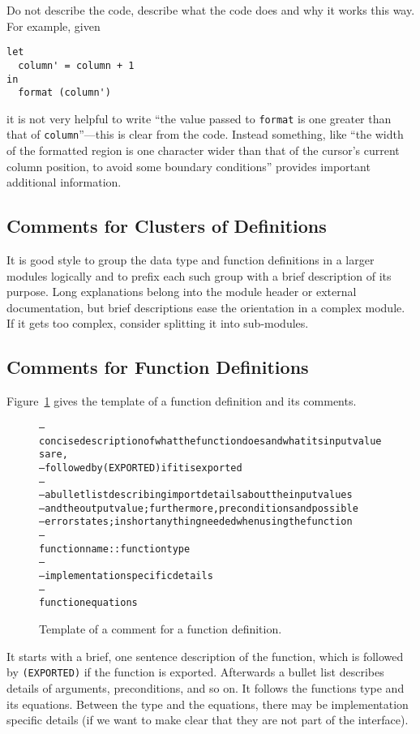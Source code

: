 \documentclass{report}
\newcommand{\code}[1]{\texttt{#1}}
\newcommand{\schema}[1]{\textrm{#1}}
\begin{document}
Do not describe the code, describe what the code does and why it works this
way.  For example, given
%
\begin{verbatim}
let
  column' = column + 1
in
  format (column')
\end{verbatim}
%
it is not very helpful to write ``the value passed to \texttt{format} is one
greater than that of \texttt{column}''---this is clear from the code.  Instead
something, like ``the width of the formatted region is one character wider than
that of the cursor's current column position, to avoid some boundary
conditions'' provides important additional information.

\subsection{Comments for Clusters of Definitions}

It is good style to group the data type and function definitions in a larger
modules logically and to prefix each such group with a brief description of
its purpose.  Long explanations belong into the module header or external
documentation, but brief descriptions ease the orientation in a complex
module.  If it gets too complex, consider splitting it into sub-modules.

\subsection{Comments for Function Definitions}

Figure~\ref{fig:fun-comment} gives the template of a function definition and
its comments.
%
\begin{figure}
\begin{alltt}
-- \schema{concise description of what the function does and what its input values are,}
-- \schema{followed by \texttt{(EXPORTED)} if it is exported}
--
-- \schema{a bullet list describing import details about the input values}
-- \schema{and the output value; furthermore, preconditions and possible}
-- \schema{error states; in short anything needed when using the function}
--
\schema{function name} :: \schema{function type}
--
-- \schema{implementation specific details}
--
\schema{function equations}
\end{alltt}
\caption{Template of a comment for a function definition.}
\label{fig:fun-comment}
\end{figure}
%
It starts with a brief, one sentence description of the function, which is
followed by \code{(EXPORTED)} if the function is exported.  Afterwards a
bullet list describes details of arguments, preconditions, and so on.  It
follows the functions type and its equations.  Between the type and the
equations, there may be implementation specific details (if we want to make
clear that they are not part of the interface).
\end{document}
